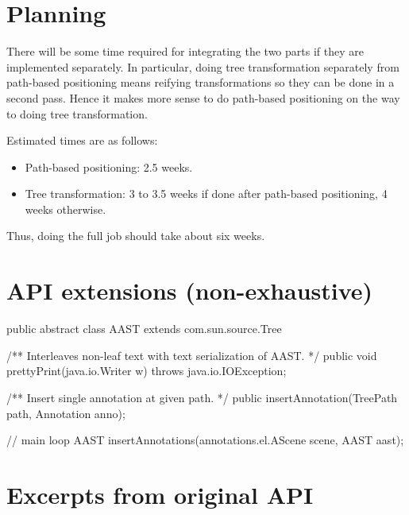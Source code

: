 \documentclass{article}
\newenvironment{jcode}{\footnotesize\verbatim}{\endverbatim\normalsize}
\begin{document}
\section{Planning}

There will be some time required for integrating the two parts if they
are implemented separately.  In particular, doing tree transformation
separately from path-based positioning means reifying transformations
so they can be done in a second pass.  Hence it makes more sense to
do path-based positioning on the way to doing tree transformation.

Estimated times are as follows:
\begin{itemize}
\item  Path-based positioning: 2.5 weeks.
\item  Tree transformation: 3 to 3.5 weeks if done after path-based
positioning, 4 weeks otherwise.
\end{itemize}
Thus, doing the full job should take about six weeks.

\appendix

\section{API extensions (non-exhaustive)}

\begin{jcode}
public abstract class AAST extends com.sun.source.Tree {
  /** Interleaves non-leaf text with text serialization of AAST. */
  public void prettyPrint(java.io.Writer w) throws java.io.IOException;

  /** Insert single annotation at given path. */
  public insertAnnotation(TreePath path, Annotation anno);
}

// main loop
AAST insertAnnotations(annotations.el.AScene scene, AAST aast);
\end{jcode}

\newpage
\section{Excerpts from original API}\label{sec:exc}
\end{document}
